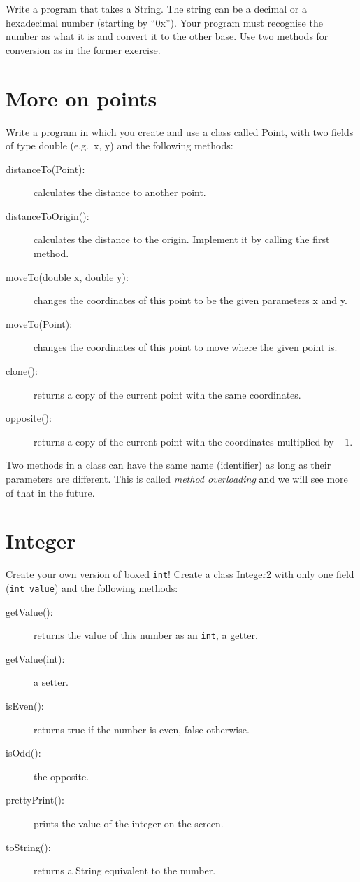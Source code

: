 \documentclass{article}
\begin{document}
Write a program that takes a String. The string can be a decimal or a
hexadecimal number (starting by ``0x''). Your program must recognise
the number as what it is and convert it to the other base. Use two
methods for conversion as in the former exercise. 

\section{More on points}
\label{sec:more-points}

Write a program in which you create and use a class called Point, 
with two fields of type double (e.g.~x, y) and the
following methods: 

\begin{description}
\item[distanceTo(Point): ] calculates the distance to another point.
\item[distanceToOrigin(): ] calculates the distance to the
  origin. Implement it by calling the first method.
\item[moveTo(double x, double y): ] changes the coordinates of this point to
  be the given parameters x and y. 
\item[moveTo(Point): ] changes the coordinates of this point to move
  where the given point is.
\item[clone(): ] returns a copy of the current point with the same
  coordinates.
\item[opposite(): ] returns a copy of the current point with the
  coordinates multiplied by $-1$. 
\end{description}

Two methods in a class can have the same name (identifier) as long as
their parameters are different. This is called \emph{method
  overloading} and we will see more of that in the future.

\section{Integer}
\label{sec:integer}

Create your own version of boxed \verb+int+! Create a class Integer2
with only one field (\verb+int value+) and the following methods: 

\begin{description}
\item[getValue(): ] returns the value of this number as an
  \verb+int+, a getter. 
\item[getValue(int): ] a setter.
\item[isEven(): ] returns true if the number is even, false
  otherwise.
\item[isOdd(): ] the opposite.
\item[prettyPrint(): ] prints the value of the integer on the screen.
\item[toString(): ] returns a String equivalent to the number. 
\end{description}
\end{document}
